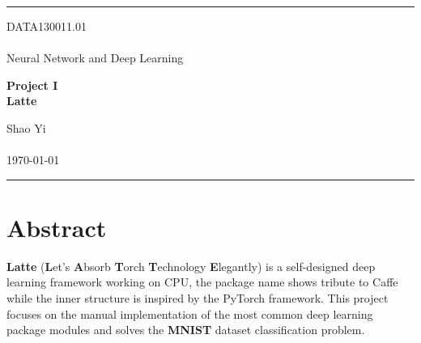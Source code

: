 \documentclass[a4paper, 11pt]{article} %
\begin{document}

\fancyhead[C]{}
\hrule \medskip %
\begin{minipage}{0.295\textwidth} %
    \raggedright
    DATA130011.01\\ %
    \footnotesize %
    \hfill\\
    Neural Network and Deep Learning\\ %
\end{minipage}
\begin{minipage}{0.4\textwidth} %
    \centering
    \large %
    \textbf{Project I}\\ %
    \normalsize %
    \textbf{Latte}\\ %
\end{minipage}
\begin{minipage}{0.295\textwidth} %
    \raggedleft
    Shao Yi\\ %
    \footnotesize %
    \hfill\\
    \today\\ %
\end{minipage}
\medskip\hrule %
\bigskip


\section*{\textbf{Abstract}}

\textbf{Latte} (\textbf{L}et's \textbf{A}bsorb \textbf{T}orch \textbf{T}echnology
\textbf{E}legantly) is a self-designed deep learning framework working on CPU, the package
name shows tribute to Caffe while the inner structure is inspired by the PyTorch framework.
This project focuses on the manual implementation of the most common deep learning package
modules and solves the \textbf{MNIST} dataset classification problem.

\bigskip

\end{document}
